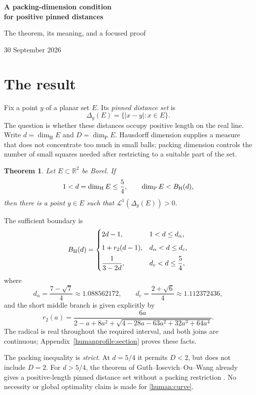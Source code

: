 \documentclass[11pt]{article}
\newtheorem{theorem}{Theorem}[section]
\theoremstyle{definition}\newtheorem{remark}[theorem]{Remark}
\newcommand{\R}{\mathbb R}
\newcommand{\HH}{\dim_{\mathrm H}}\newcommand{\PP}{\dim_{\mathrm P}}
\begin{document}
\begin{center}
{\LARGE\bfseries A packing-dimension condition\\[4pt]
for positive pinned distances}\par
\vspace{5pt}
{\large The theorem, its meaning, and a focused proof}\par
\vspace{3pt}
30 September 2026
\end{center}

\section{The result}
Fix a point \(y\) of a planar set \(E\). Its \emph{pinned distance set} is
\[
 \Delta_y(E)=\{|x-y|:x\in E\}.
\]
The question is whether these distances occupy positive length on the real
line. Write \(d=\HH E\) and \(D=\PP E\). Hausdorff dimension supplies
a measure that does not concentrate too much in small balls; packing
dimension controls the number of small squares needed after restricting
to a suitable part of the set.

\begin{theorem}\label{human:target}
Let \(E\subset\R^2\) be Borel. If
\[
 1<d=\HH E\le\frac54,\qquad \PP E<B_{\rm H}(d),
\]
then there is a point \(y\in E\) such that
\(\mathcal L^1(\Delta_y(E))>0\).
\end{theorem}

The sufficient boundary is
\begin{equation}\label{human:curve}
 B_{\rm H}(d)=
 \begin{cases}
  2d-1,&1<d\le d_\alpha,\\[5pt]
  1+r_2(d-1),&d_\alpha<d\le d_c,\\[5pt]
  \dfrac1{3-2d},&d_c<d\le\dfrac54,
 \end{cases}
\end{equation}
where
\[
 d_\alpha=\frac{7-\sqrt7}{4}\approx1.088562172,
 \qquad d_c=\frac{2+\sqrt6}{4}\approx1.112372436,
\]
and the short middle branch is given explicitly by
\begin{equation}\label{human:root}
 r_2(a)=\frac{6a}
 {2-a+8a^2+\sqrt{4-28a-63a^2+32a^3+64a^4}}.
\end{equation}
The radical is real throughout the required interval, and both joins are
continuous; Appendix~\ref{humanprofile:section} proves these facts.

The packing inequality is \emph{strict}. At \(d=5/4\) it permits
\(D<2\), but does not include \(D=2\). For \(d>5/4\), the theorem of
Guth--Iosevich--Ou--Wang already gives a positive-length pinned distance set
without a packing restriction \cite{giow}. No necessity or global optimality
claim is made for \eqref{human:curve}.
\end{document}
